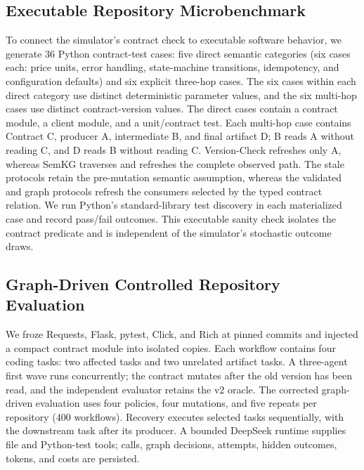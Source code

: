 \documentclass[a4paper,runningheads]{llncs}
\begin{document}
\subsection{Executable Repository Microbenchmark}
To connect the simulator's contract check to executable software behavior, we generate 36 Python contract-test cases: five direct semantic categories (six cases each: price units, error handling, state-machine transitions, idempotency, and configuration defaults) and six explicit three-hop cases. The six cases within each direct category use distinct deterministic parameter values, and the six multi-hop cases use distinct contract-version values. The direct cases contain a contract module, a client module, and a unit/contract test. Each multi-hop case contains Contract C, producer A, intermediate B, and final artifact D; B reads A without reading C, and D reads B without reading C. Version-Check refreshes only A, whereas SemKG traverses and refreshes the complete observed path. The stale protocols retain the pre-mutation semantic assumption, whereas the validated and graph protocols refresh the consumers selected by the typed contract relation. We run Python's standard-library test discovery in each materialized case and record pass/fail outcomes. This executable sanity check isolates the contract predicate and is independent of the simulator's stochastic outcome draws.

\subsection{Graph-Driven Controlled Repository Evaluation}
We froze Requests, Flask, pytest, Click, and Rich at pinned commits and injected a compact contract module into isolated copies. Each workflow contains four coding tasks: two affected tasks and two unrelated artifact tasks. A three-agent first wave runs concurrently; the contract mutates after the old version has been read, and the independent evaluator retains the v2 oracle. The corrected graph-driven evaluation uses four policies, four mutations, and five repeats per repository (400 workflows). Recovery executes selected tasks sequentially, with the downstream task after its producer. A bounded DeepSeek runtime supplies file and Python-test tools; calls, graph decisions, attempts, hidden outcomes, tokens, and costs are persisted.
\end{document}
